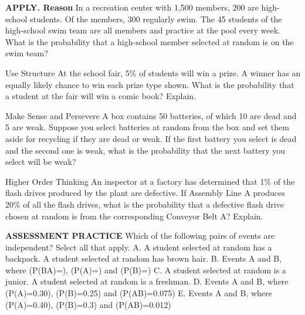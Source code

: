 \documentclass{article}
\newenvironment{practice}[2]{}{}        %
\newcommand{\answer}[1]{}               %
\newcommand{\placeholder}[2]{}          %
\begin{document}
\begin{practice}{23}{2}
\textbf{APPLY. Reason} In a recreation center with 1,500 members, 200 are high-school students. Of the members, 300 regularly swim. The 45 students of the high-school swim team are all members and practice at the pool every week. What is the probability that a high-school member selected at random is on the swim team?
\answer{0.225 or 22.5\%}
\end{practice}
\begin{practice}{24}{2}
Use Structure At the school fair, 5\% of students will win a prize. A winner has an equally likely chance to win each prize type shown. What is the probability that a student at the fair will win a comic book? Explain.
\placeholder{illustration}{Purple tablecloth labeled PRIZES. Five types of prizes: comic books, small rectangular item, key rings, caps and blue bottles.}
\answer{0.01 or 1\%; Answers may vary. Sample: (P(\text{prize})=0.05) and (P(\text{comic}\mid\text{prize})=0.2), so (P(\text{prize and comic})=P(\text{prize})\cdot P(\text{comic}\mid\text{prize})=(0.05)(0.2)=0.01)}
\end{practice}
\begin{practice}{25}{2}
Make Sense and Persevere A box contains 50 batteries, of which 10 are dead and 5 are weak. Suppose you select batteries at random from the box and set them aside for recycling if they are dead or weak. If the first battery you select is dead and the second one is weak, what is the probability that the next battery you select will be weak?
\answer{(\frac1{12}) or about 0.08 or 8\%}
\end{practice}
\begin{practice}{26}{3}
Higher Order Thinking An inspector at a factory has determined that 1\% of the flash drives produced by the plant are defective. If Assembly Line A produces 20\% of all the flash drives, what is the probability that a defective flash drive chosen at random is from the corresponding Conveyor Belt A? Explain.
\placeholder{illustration}{Two curved conveyor belts with multicolored flash drives; orange collection bin below. Label Conveyor Belt A, Defective Rate: 1.5 percent.}
\answer{0.3 or 30\%; (P(A\mid\text{defective})=\frac{P(A\text{ and defective})}{P(\text{defective})}=\frac{P(\text{defective}\mid A)\cdot P(A)}{P(\text{defective})}=\frac{(0.015)(0.2)}{(0.01)}=0.3)}
\end{practice}
\begin{practice}{27}{3}
\textbf{ASSESSMENT PRACTICE}
Which of the following pairs of events are independent? Select all that apply.
A. A student selected at random has a backpack. A student selected at random has brown hair.
B. Events A and B, where (P(B\mid A)=), (P(A)=) and (P(B)=)
C. A student selected at random is a junior. A student selected at random is a freshman.
D. Events A and B, where (P(A)=0.30), (P(B)=0.25) and (P(AB)=0.075)
E. Events A and B, where (P(A)=0.40), (P(B)=0.3) and (P(AB)=0.012)
\answer{A, D}
\end{practice}
\end{document}
